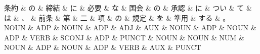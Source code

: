 \documentclass[tikz,border=5pt]{standalone}
\begin{document}
\normalsize
\begin{dependency}[edge unit distance=12.0pt]
    \begin{deptext}[column sep=1em]
        条約 \& の \& 締結 \& に \& 必要 \& な \& 国会 \& の \& 承認 \& に \& つい \& て \& は \& 、 \& 前条 \& 第 \& 二 \& 項 \& の \& 規定 \& を \& 準用 \& する \& 。\\
        NOUN \& ADP \& NOUN \& ADP \& ADJ \& AUX \& NOUN \& ADP \& NOUN \& ADP \& VERB \& SCONJ \& ADP \& PUNCT \& NOUN \& NOUN \& NUM \& NOUN \& ADP \& NOUN \& ADP \& VERB \& AUX \& PUNCT\\
    \end{deptext}
\end{dependency}
\end{document}
